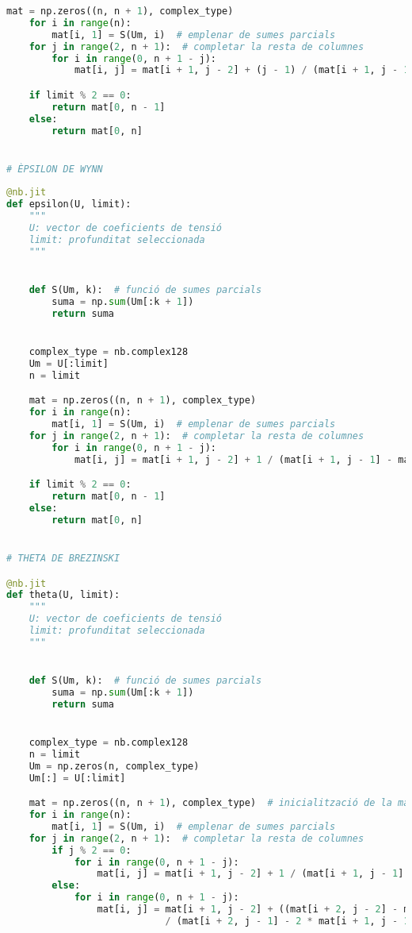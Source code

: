 \begin{lstlisting}[language=Python,numbers=none]
    mat = np.zeros((n, n + 1), complex_type)
    for i in range(n):
        mat[i, 1] = S(Um, i)  # emplenar de sumes parcials
    for j in range(2, n + 1):  # completar la resta de columnes
        for i in range(0, n + 1 - j):
            mat[i, j] = mat[i + 1, j - 2] + (j - 1) / (mat[i + 1, j - 1] - mat[i, j - 1])

    if limit % 2 == 0:
        return mat[0, n - 1]
    else:
        return mat[0, n]


# ÈPSILON DE WYNN
    
@nb.jit
def epsilon(U, limit):
    """
    U: vector de coeficients de tensió
    limit: profunditat seleccionada
    """


    def S(Um, k):  # funció de sumes parcials
        suma = np.sum(Um[:k + 1])
        return suma


    complex_type = nb.complex128
    Um = U[:limit]
    n = limit

    mat = np.zeros((n, n + 1), complex_type)
    for i in range(n):
        mat[i, 1] = S(Um, i)  # emplenar de sumes parcials
    for j in range(2, n + 1):  # completar la resta de columnes
        for i in range(0, n + 1 - j):
            mat[i, j] = mat[i + 1, j - 2] + 1 / (mat[i + 1, j - 1] - mat[i, j - 1])

    if limit % 2 == 0:
        return mat[0, n - 1]
    else:
        return mat[0, n]


# THETA DE BREZINSKI

@nb.jit
def theta(U, limit):
    """
    U: vector de coeficients de tensió
    limit: profunditat seleccionada
    """


    def S(Um, k):  # funció de sumes parcials
        suma = np.sum(Um[:k + 1])
        return suma


    complex_type = nb.complex128
    n = limit
    Um = np.zeros(n, complex_type)
    Um[:] = U[:limit]

    mat = np.zeros((n, n + 1), complex_type)  # inicialització de la matriu
    for i in range(n):
        mat[i, 1] = S(Um, i)  # emplenar de sumes parcials
    for j in range(2, n + 1):  # completar la resta de columnes
        if j % 2 == 0:
            for i in range(0, n + 1 - j):
                mat[i, j] = mat[i + 1, j - 2] + 1 / (mat[i + 1, j - 1] - mat[i, j - 1])
        else:
            for i in range(0, n + 1 - j):
                mat[i, j] = mat[i + 1, j - 2] + ((mat[i + 2, j - 2] - mat[i + 1, j - 2]) * (mat[i + 2, j - 1] - mat[i + 1, j - 1])) \
                            / (mat[i + 2, j - 1] - 2 * mat[i + 1, j - 1] + mat[i, j - 1])
                            

\end{lstlisting}
